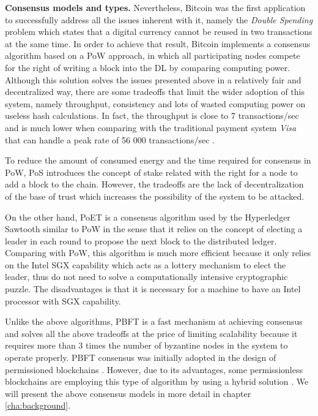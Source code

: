 \textbf{Consensus models and types.} Nevertheless, Bitcoin \cite{bitcoin} was the first application to successfully address all the issues inherent with it, namely the \textit{Double Spending} problem which states that a digital currency cannot be reused in two transactions at the same time. In order to achieve that result, Bitcoin implements a consensus algorithm based on a \gls{PoW} \cite{pow} approach, in which all participating nodes compete for the right of writing a block into the \gls{DL} by comparing computing power. Although this solution solves the issues presented above in a relatively fair and decentralized way, there are some tradeoffs that limit the wider adoption of this system, namely throughput, consistency and lots of wasted computing power on useless hash calculations. In fact, the throughput is close to 7 transactions/sec and is much lower when comparing with the traditional payment system \textit{Visa} that can handle a peak rate of 56 000 transactions/sec \cite{pow_vs_visa}. %

To reduce the amount of consumed energy and the time required for consensus in \gls{PoW}, \gls{PoS} \cite{pow_vs_pos_eval_performance_and_security} introduces the concept of stake related with the right for a node to add a block to the chain. However, the tradeoffs are the lack of decentralization of the base of trust which increases the possibility of the system to be attacked.

On the other hand, \gls{PoET} \cite{poet_security_analysis} is a consensus algorithm used by the Hyperledger Sawtooth \cite{hyperledger_sawtooth} similar to \gls{PoW} in the sense that it relies on the concept of electing a leader in each round to propose the next block to the distributed ledger. Comparing with \gls{PoW}, this algorithm is much more efficient because it only relies on the Intel \gls{SGX} capability which acts as a lottery mechanism to elect the leader, thus do not need to solve a computationally intensive cryptographic puzzle. The disadvantages is that it is necessary for a machine to have an Intel processor with \gls{SGX} capability.

Unlike the above algorithms, \gls{PBFT} \cite{pbft} is a fast mechanism at achieving consensus and solves all the above tradeoffs at the price of limiting scalability because it requires more than 3 times the number of byzantine nodes in the system to operate properly. \gls{PBFT} consensus was initially adopted in the design of permissioned blockchains \cite{hyperleder_fabric, r3-corda, tendermint}. However, due to its advantages, some permissionless blockchains are employing this type of algorithm by using a hybrid solution \cite{bitcoin-ng, hybrid_consensus, peercensus, byzcoin, solida}. We will present the above consensus models in more detail in chapter \ref{cha:background}.


